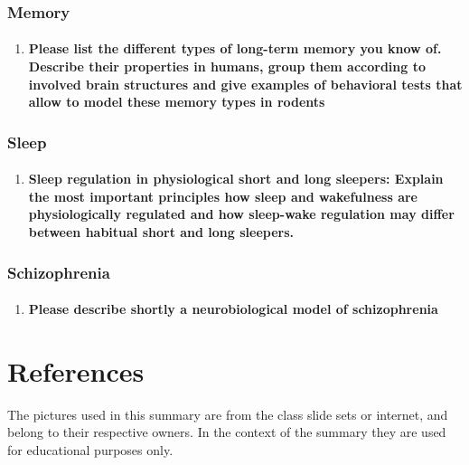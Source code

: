 \documentclass[12pt,article,oneside,a4paper]{memoir}
\begin{document}
\subsubsection{Memory}
\begin{enumerate}
\item \paragraph{Please list the different types of long-term memory you know of. Describe their properties in humans, group them according to involved brain structures and give examples of behavioral tests that allow to model these memory types in rodents}
\end{enumerate}

\subsubsection{Sleep}
\begin{enumerate}
\item \paragraph{Sleep regulation in physiological short and long sleepers: Explain the most important principles how sleep and wakefulness are physiologically regulated and how sleep-wake regulation may differ between habitual short and long sleepers.}

\end{enumerate}

\subsubsection{Schizophrenia}
\begin{enumerate}
\item \paragraph{Please describe shortly a neurobiological model of schizophrenia}
\end{enumerate}

	





\newpage

\section{References}
The pictures used in this summary are from the class slide sets or internet, and belong to their respective owners. In the context of the summary they are used for educational purposes only.
\end{document}
